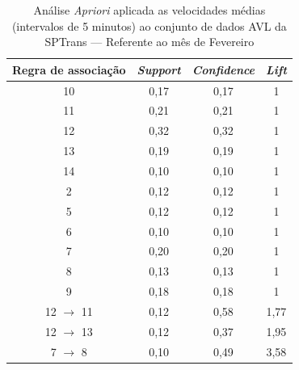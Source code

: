 \documentclass[
	12pt,				%
	oneside,			%
	a4paper,			%
	english,			%
	brazil				%
	]{abntex2ppgsi}
\begin{document}
{{\begin{apendicesenv}
\begin{table}[!htb]
\centering
\caption {Análise \textit{Apriori} aplicada as velocidades médias (intervalos de 5 minutos) ao conjunto de dados AVL da SPTrans --- Referente ao mês de Fevereiro}
\label {tab:aprioriFebruary}
\begin{tabular}{c|c|c|c}
\toprule
\textbf{Regra de associação} & \textit{\textbf{Support}} & \textit{\textbf{Confidence}} & \textit{\textbf{Lift}} \\
\midrule
10 &  0,17 &  0,17 &  1\\
 \hline 
 11 &  0,21 &  0,21 &  1\\ 
 \hline 
 12 &  0,32 &  0,32 &  1\\ 
 \hline 
 13 &  0,19 &  0,19&  1\\ 
 \hline 
 14 &  0,10 &  0,10 &  1\\ 
 \hline 
 2 &  0,12 &  0,12 &  1\\ 
 \hline 
 5 &  0,12 &  0,12 &  1\\ 
 \hline 
 6 &  0,10 &  0,10 &  1\\ 
 \hline 
 7 &  0,20 &  0,20 &  1\\ 
 \hline 
 8 &  0,13 &  0,13 &  1\\ 
 \hline 
 9 &  0,18 &  0,18 &  1\\
  \hline 
 12 $\rightarrow$ 11 &  0,12 &  0,58 &  1,77\\ 
 \hline 
 12 $\rightarrow$ 13 &  0,12 &  0,37 &  1,95\\ 
 \hline 7 $\rightarrow$ 8 &  0,10 &  0,49 &  3,58\\
\bottomrule
\end{tabular}
\end{table}


\end{apendicesenv}}}
\end{document}
